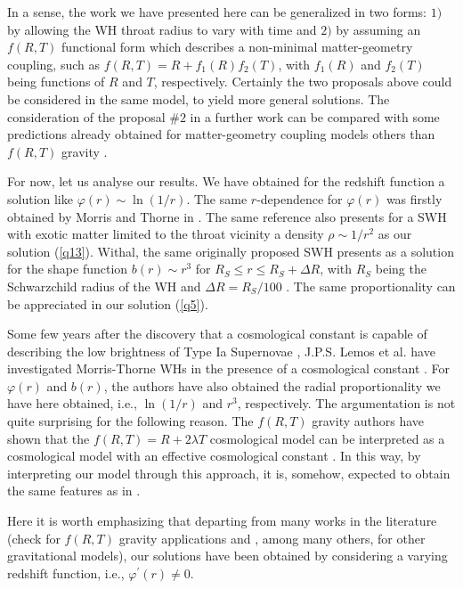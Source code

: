 \documentclass[aps,preprint,onecolumn,11pt,showkeys]{revtex4}%
\begin{document}
In a sense, the work we have presented here can be generalized in two forms:
$1)$ by allowing the WH throat radius to vary with time and $2)$ by assuming
an $f(R,T)$ functional form which describes a non-minimal matter-geometry
coupling, such as $f(R,T)=R+f_{1}(R)f_{2}(T)$, with $f_{1}(R)$ and $f_{2}(T)$
being functions of $R$ and $T$, respectively. Certainly the two proposals
above could be considered in the same model, to yield more general solutions.
The consideration of the proposal $\# 2$ in a further work can be compared
with some predictions already obtained for matter-geometry coupling models
others than $f(R,T)$ gravity \cite{garcia/2011,garcia/2010}.

For now, let us analyse our results. We have obtained for the redshift
function a solution like $\varphi(r)\sim\ln(1/r)$. The same $r$-dependence for
$\varphi(r)$ was firstly obtained by Morris and Thorne in \cite{morris/1988}.
The same reference also presents for a SWH with exotic matter limited to the
throat vicinity a density $\rho\sim1/r^{2}$ as our solution (\ref{q13}).
Withal, the same originally proposed SWH presents as a solution for the shape
function $b(r)\sim r^{3}$ for $R_{S}\leq r\leq R_{S}+\Delta R$, with $R_{S}$
being the Schwarzchild radius of the WH and $\Delta R=R_{S}/100$
\cite{morris/1988}. The same proportionality can be appreciated in our
solution (\ref{q5}).

Some few years after the discovery that a cosmological constant is capable of
describing the low brightness of Type Ia Supernovae
\cite{riess/1998,perlmutter/1999}, J.P.S. Lemos et al. have investigated
Morris-Thorne WHs in the presence of a cosmological constant \cite{lemos/2003}%
. For $\varphi(r)$ and $b(r)$, the authors have also obtained the radial
proportionality we have here obtained, i.e., $\ln(1/r)$ and $r^{3}$,
respectively. The argumentation is not quite surprising for the following
reason. The $f(R,T)$ gravity authors have shown that the
$f(R,T)=R+2\lambda T$ cosmological model can be interpreted as a cosmological
model with an effective cosmological constant \cite{harko/2011}. In this way,
by interpreting our model through this approach, it is, somehow, expected to
obtain the same features as in \cite{lemos/2003}.

Here it is worth emphasizing that departing from many works in the literature
(check \cite{azizi/2013,zubair/2016b} for $f(R,T)$ gravity applications and
\cite{jawad/2015,jamil/2013,jamil/2009}, among many others, for other
gravitational models), our solutions have been obtained by considering a
varying redshift function, i.e., $\varphi^{\prime}(r)\neq0$.
\end{document}
